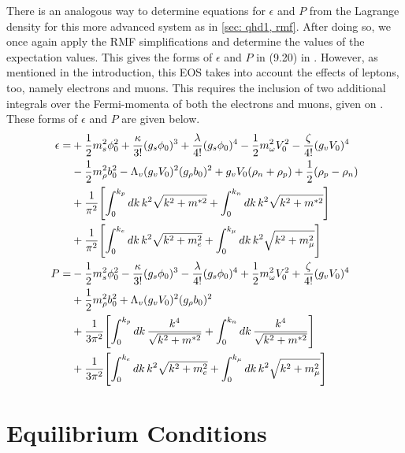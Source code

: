 There is an analogous way to determine equations for $\epsilon$ and $P$ from the Lagrange density for this more advanced system as in \autoref{sec: qhd1, rmf}. After doing so, we once again apply the RMF simplifications and determine the values of the expectation values. This gives the forms of $\epsilon$ and $P$ in (9.20) in \autocite[p. 79]{diener_2008}. However, as mentioned in the introduction, this EOS takes into account the effects of leptons, too, namely electrons and muons. This requires the inclusion of two additional integrals over the Fermi-momenta of both the electrons and muons, given on \autocite[p. 92]{diener_2008}. These forms of $\epsilon$ and $P$ are given below.
\begin{align}
    \epsilon = & +\frac{1}{2}m_s^2\phi_0^2 + \frac{\kappa}{3!} (g_s\phi_0)^3 + \frac{\lambda}{4!}(g_s\phi_0)^4 - \frac 12 m_\omega^2V_0^2 - \frac{\zeta}{4!}(g_vV_0)^4 \nonumber\\
    & - \frac 12 m_\rho^2 b_0^2 - \Lambda_v(g_vV_0)^2(g_\rho b_0)^2 + g_vV_0(\rho_n + \rho_p) + \frac{1}{2} (\rho_p-\rho_n) \nonumber\\
    & + \frac{1}{\pi^2}\bqty{\int_0^{k_p} \dd{k} k^2 \sqrt{k^2 + m^{*2}} + \int_0^{k_n} \dd{k} k^2 \sqrt{k^2 + m^{*2}}}\nonumber\\
    & + \frac{1}{\pi^2} \bqty{\int_0^{k_e} \dd{k} k^2 \sqrt{k^2 + m_e^2} + \int_0^{k_\mu} \dd{k} k^2 \sqrt{k^2 + m_\mu^2}}\label{eqn: adv, eps}\\
    P = & -\frac{1}{2}m_s^2\phi_0^2 - \frac{\kappa}{3!} (g_s\phi_0)^3 - \frac{\lambda}{4!}(g_s\phi_0)^4 + \frac 12 m_\omega^2V_0^2 + \frac{\zeta}{4!}(g_vV_0)^4 \nonumber\\
    & + \frac 12 m_\rho^2 b_0^2 + \Lambda_v(g_vV_0)^2(g_\rho b_0)^2 \nonumber\\
    & + \frac{1}{3\pi^2}\bqty{\int_0^{k_p} \dd{k} \frac{k^4}{\sqrt{k^2 + m^{*2}}} + \int_0^{k_n} \dd{k} \frac{k^4}{\sqrt{k^2 + m^{*2}}}}\nonumber\\
    & + \frac{1}{3\pi^2} \bqty{\int_0^{k_e} \dd{k} k^2 \sqrt{k^2 + m_e^2} + \int_0^{k_\mu} \dd{k} k^2 \sqrt{k^2 + m_\mu^2}} \label{eqn: adv, p}
\end{align}



\section{Equilibrium Conditions}\label{sec: adv, constraints}

